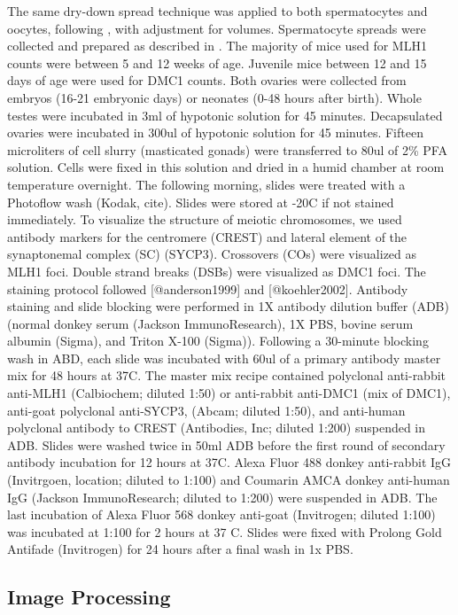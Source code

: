 \documentclass[9pt,lineno]{elife}
\begin{document}
The same dry-down spread technique was applied to both spermatocytes and oocytes, following \citep{peters_1997}, with adjustment for volumes. Spermatocyte spreads were collected and prepared as described in \citep{peterson2019}. The majority of mice used for MLH1 counts were between 5 and 12 weeks of age. Juvenile mice between 12 and 15 days of age were used for DMC1 counts. Both ovaries were collected from embryos (16-21 embryonic days) or neonates (0-48 hours after birth). Whole testes were incubated in 3ml of hypotonic solution for 45 minutes. Decapsulated ovaries were incubated in 300ul of hypotonic solution for 45 minutes. Fifteen microliters of cell slurry (masticated gonads) were transferred to 80ul of 2\% PFA solution. Cells were fixed in this solution and dried in a humid chamber at room temperature overnight. The following morning, slides were treated with a Photoflow wash (Kodak, cite). Slides were stored at -20\*C if not stained immediately. To visualize the structure of meiotic chromosomes, we used antibody markers for the centromere (CREST) and lateral element of the synaptonemal complex (SC) (SYCP3). Crossovers (COs) were visualized as MLH1 foci. Double strand breaks (DSBs) were visualized as DMC1 foci. The staining protocol followed [@anderson1999] and [@koehler2002]. Antibody staining and slide blocking were performed in 1X antibody dilution buffer (ADB) (normal donkey serum (Jackson ImmunoResearch), 1X PBS, bovine serum albumin (Sigma), and Triton X-100 (Sigma)). Following a 30-minute blocking wash in ABD, each slide was incubated with 60ul of a primary antibody master mix for 48 hours at 37\*C. The master mix recipe contained polyclonal anti-rabbit anti-MLH1 (Calbiochem; diluted 1:50) or anti-rabbit anti-DMC1 (mix of DMC1), anti-goat polyclonal anti-SYCP3, (Abcam; diluted 1:50), and anti-human polyclonal antibody to CREST (Antibodies, Inc; diluted 1:200) suspended in ADB. Slides were washed twice in 50ml ADB before the first round of secondary antibody incubation for 12 hours at 37\*C. Alexa Fluor 488 donkey anti-rabbit IgG (Invitrgoen, location; diluted to 1:100) and Coumarin AMCA donkey anti-human IgG (Jackson ImmunoResearch; diluted to 1:200) were suspended in ADB. The last incubation of Alexa Fluor 568 donkey anti-goat (Invitrogen; diluted 1:100) was incubated at 1:100 for 2 hours at 37\* C. Slides were fixed with Prolong Gold Antifade (Invitrogen) for 24 hours after a final wash in 1x PBS.

\subsection{Image Processing}
\end{document}
